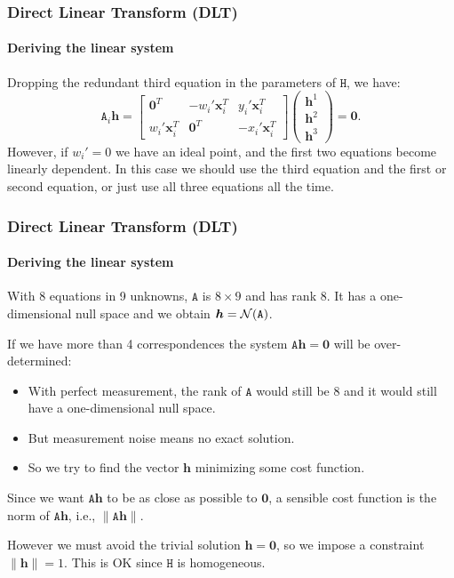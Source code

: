 \documentclass[aspectratio=169]{beamer}
\renewcommand{\vec}[1]{\boldsymbol{#1}}
\newcommand{\mat}[1]{\mathtt{#1}}
\renewcommand{\null}[1]{{\cal N}(#1)}
\begin{document}
\begin{frame}
\frametitle{Direct Linear Transform (DLT)}
\framesubtitle{Deriving the linear system}

Dropping the redundant third equation in the parameters of $\mat{H}$, we have:
\begin{equation}
\label{dlt-eqn}
\mat{A}_i\vec{h} = 
\begin{bmatrix}
\vec{0}^T        & -w_i'\vec{x}_i^T & y_i'\vec{x}_i^T  \\
w_i'\vec{x}_i^T  & \vec{0}^T        & -x_i'\vec{x}_i^T \end{bmatrix}
\begin{pmatrix} \vec{h}^1 \\ \vec{h}^2 \\ \vec{h}^3 \end{pmatrix} =
\vec{0}.
\end{equation}
However, if $w_i' = 0$ we have an ideal point, and the first two
equations become linearly dependent.  In this case we should use the
third equation and the first or second equation, or just use all three
equations all the time.

\end{frame}

\begin{frame}
\frametitle{Direct Linear Transform (DLT)}
\framesubtitle{Deriving the linear system}

With 8 equations in 9 unknowns, $\mat{A}$ is $8\times 9$ and has rank
8.  It has a one-dimensional null space and we obtain $\vec{h} =
\null{\mat{A}}$.

\medskip

If we have \alert{more than 4 correspondences} the system
$\mat{A}\vec{h}=\vec{0}$ will be \alert{over-determined}:
\begin{itemize}
\item With \alert{perfect measurement}, the rank of $\mat{A}$ would
  still be 8 and it would still have a one-dimensional null space.
\item But \alert{measurement noise} means no exact solution.
\item So we try to find the vector $\vec{h}$ minimizing some \alert{cost
  function}.
\end{itemize}

\medskip

Since we want $\mat{A}\vec{h}$ to be as close as possible to
$\vec{0}$, a sensible cost function is the \alert{norm} of
$\mat{A}\vec{h}$, i.e., $\|\mat{A}\vec{h}\|$.

\medskip

However we must avoid the \alert{trivial solution} $\vec{h}=\vec{0}$,
so we impose a constraint $\|\vec{h}\|=1$.  This is OK since $\mat{H}$
is homogeneous.

\end{frame}
\end{document}
